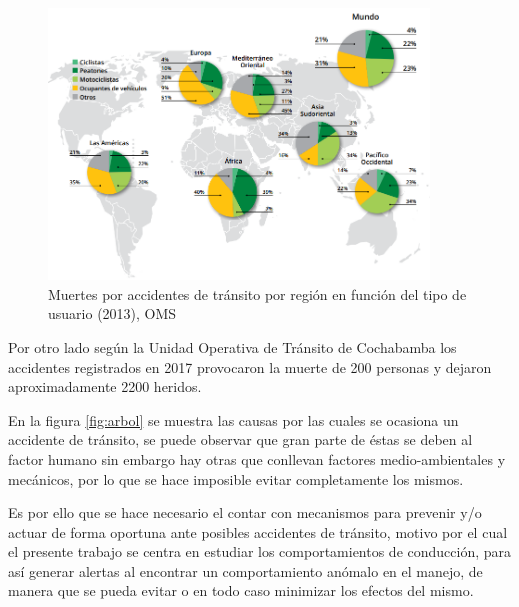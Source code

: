 \vspace{5mm} %

\begin{figure}[h!]
  \begin{center}	\includegraphics[width=0.9\textwidth, fbox]{imagenes/Cap1/oms1}
  \caption{Muertes por accidentes de tránsito por regi\'{o}n en función del tipo de usuario (2013), OMS}
  \label{fig:oms}  
  \end{center}
\end{figure}

Por otro lado seg\'{u}n la Unidad Operativa de Tr\'{a}nsito de Cochabamba los accidentes registrados en 2017 provocaron la muerte de 200 personas y dejaron aproximadamente 2200 heridos.
	
\vspace{5mm} %

En la figura \ref{fig:arbol} se muestra las causas por las cuales se ocasiona un accidente de tr\'{a}nsito, se puede observar que gran parte de \'{e}stas se deben al factor humano sin embargo hay otras que conllevan factores medio-ambientales y mec\'{a}nicos, por lo que se hace imposible evitar completamente los mismos. 

\vspace{5mm} %

Es por ello que se hace necesario el contar con mecanismos para prevenir y/o actuar de forma oportuna ante posibles accidentes de tr\'{a}nsito, motivo por el cual el presente trabajo se centra en estudiar los comportamientos de conducci\'{o}n, para as\'{i} generar alertas al encontrar un comportamiento an\'{o}malo en el manejo, de manera que se pueda evitar o en todo caso minimizar los efectos del mismo.

